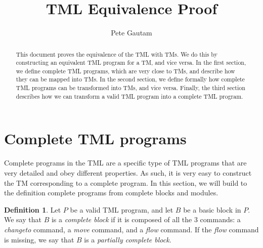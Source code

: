 \documentclass{amsart}
\title{TML Equivalence Proof}
\author[P. Gautam]{Pete Gautam}
\theoremstyle{definition}
\newtheorem{definition}[theorem]{Definition}
\begin{document}
    \begin{abstract}
        This document proves the equivalence of the TML with TMs. We do this by constructing an equivalent TML program for a TM, and vice versa. In the first section, we define complete TML programs, which are very close to TMs, and describe how they can be mapped into TMs.  In the second section, we define formally how complete TML programs can be transformed into TMs, and vice versa. Finally, the third section describes how we can transform a valid TML program into a complete TML program.
    \end{abstract}    
    \maketitle

    \section{Complete TML programs}
    \noindent Complete programs in the TML are a specific type of TML programs that are very detailed and obey different properties. As such, it is very easy to construct the TM corresponding to a complete program. In this section, we will build to the definition complete programs from complete blocks and modules.
    \begin{definition}
        Let $P$ be a valid TML program, and let $B$ be a basic block in $P$. We say that $B$ is a \emph{complete block} if it is composed of all the 3 commands: a \textit{changeto} command, a \textit{move} command, and a \textit{flow} command. If the \textit{flow} command is missing, we say that $B$ is a \emph{partially complete block}.
    \end{definition}
\end{document}
